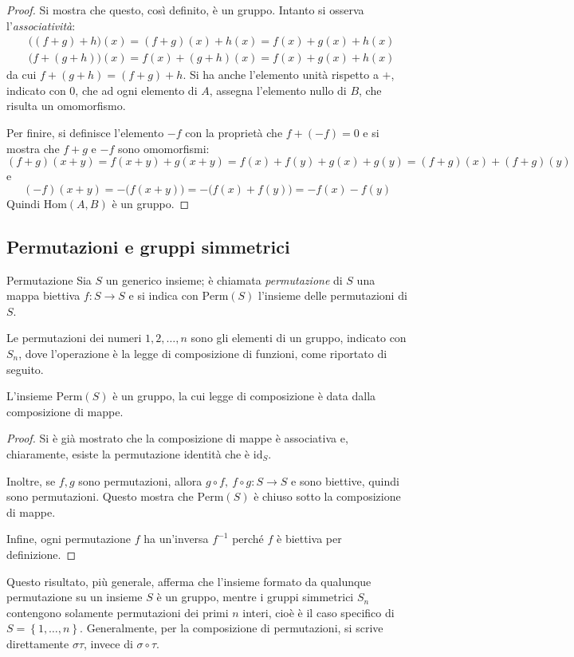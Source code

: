 \documentclass[11pt, a4paper]{scrartcl}
\theoremstyle{definition}
\numberwithin{esempio}{section}
\theoremstyle{definition}
\numberwithin{obs}{section}
\numberwithin{nota}{section}
\numberwithin{equation}{subsection}
\begin{document}
\begin{proof}
	Si mostra che questo, cos\`i definito, \`e un gruppo. Intanto si osserva l'\textit{associativit\`a}:
	\[
	\begin{split}
		&\big( (f+g) + h\big)(x) = (f+g) (x) + h(x) = f(x) + g(x) + h(x)\\
		&\big(f + (g+h)\big)(x) = f(x) + (g+h) (x) = f(x) + g(x) +h(x)
	\end{split}
	\] 
da cui $f + (g+h) = (f+g) +h$. 
Si ha anche l'elemento unit\`a rispetto a $+$, indicato con $0$, che ad ogni elemento di $A$, assegna l'elemento nullo di $B$, che risulta un omomorfismo. 

Per finire, si definisce l'elemento $-f$ con la propriet\`a che $f + (-f) = 0$ e si mostra che $f+g$ e $-f$ sono omomorfismi:
\[
		(f+g) (x+y) = f(x+y) + g(x+y) = f(x) + f(y) + g(x) + g(y) = (f+g) (x) + (f+g) (y)
\] 
e 
\[
	(-f)(x+y) = -\big(f(x+y) \big)= - \big(f(x) + f(y)\big) = - f(x) - f(y)
\] 
Quindi $\mathrm{Hom}(A,B) $ \`e un gruppo.
\end{proof} 
\subsection{Permutazioni e gruppi simmetrici}
\begin{definizione}
	{Permutazione}{}
	Sia $S$ un generico insieme; \`e chiamata \textit{permutazione} di $S$ una mappa biettiva $f: S \to S$ e si indica con $\mathrm{Perm}(S) $ l'insieme delle permutazioni di $S$.
\end{definizione}
Le permutazioni dei numeri $1,2,\ldots, n$ sono gli elementi di un gruppo, indicato con $S_n$, dove l'operazione \`e la legge di composizione di funzioni, come riportato di seguito.
\begin{prop}
	{}{}
	L'insieme $\mathrm{Perm} (S)$ \`e un gruppo, la cui legge di composizione \`e data dalla composizione di mappe.
	\begin{proof}
	Si \`e gi\`a mostrato che la composizione di mappe \`e associativa e, chiaramente, esiste la permutazione identit\`a che \`e $\mathrm{id} _S$.

	Inoltre, se $f,g$ sono permutazioni, allora $g\circ f, \ f\circ g : S \to S$ e sono biettive, quindi sono permutazioni. Questo mostra che $\mathrm{Perm} (S)$ \`e chiuso sotto la composizione di mappe.

	Infine, ogni permutazione $f$ ha un'inversa $f^{-1} $ perch\'e $f$ \`e biettiva per definizione.	
	\end{proof}
\end{prop}
\noindent Questo risultato, pi\`u generale, afferma che l'insieme formato da qualunque permutazione su un insieme $S$ \`e un gruppo, mentre i gruppi simmetrici $S_n$ contengono solamente permutazioni dei primi $n$ interi, cio\`e \`e il caso specifico di $S = \left\{ 1,\ldots,n \right\} $.
Generalmente, per la composizione di permutazioni, si scrive direttamente $\sigma \tau $, invece di $\sigma \circ \tau $.
\end{document}
